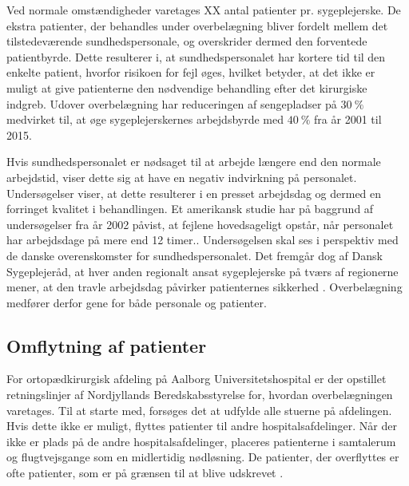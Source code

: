 \noindent 
Ved normale omstændigheder varetages XX antal patienter pr. sygeplejerske. De ekstra patienter, der behandles under overbelægning bliver fordelt mellem det tilstedeværende sundhedspersonale, og overskrider dermed den forventede patientbyrde. 
Dette resulterer i, at sundhedspersonalet har kortere tid til den enkelte patient, hvorfor risikoen for fejl øges, hvilket betyder, at det ikke er muligt at give patienterne den nødvendige behandling efter det kirurgiske indgreb. \cite{Dinges2004} \cite{Aiken2002} Udover overbelægning har reduceringen af sengepladser på $30~\%$ medvirket til, at øge sygeplejerskernes arbejdsbyrde med $40~\%$ fra år 2001 til 2015. \cite{Kjeldsen2015}


Hvis sundhedspersonalet er nødsaget til at arbejde længere end den normale arbejdstid, viser dette sig at have en negativ indvirkning på personalet.\cite{Kjeldsen2015} \cite{Dinges2004} Undersøgelser viser, at dette resulterer i en presset arbejdsdag og dermed en forringet kvalitet i behandlingen. \cite{Kjeldsen2015} Et amerikansk studie har på baggrund af undersøgelser fra år 2002 påvist, at fejlene hovedsageligt opstår, når personalet har arbejdsdage på mere end 12 timer.\cite{Dinges2004}. Undersøgelsen skal ses i perspektiv med de danske overenskomster for sundhedspersonalet. Det fremgår dog af Dansk Sygeplejeråd, at hver anden regionalt ansat sygeplejerske på tværs af regionerne mener, at den travle arbejdsdag påvirker patienternes sikkerhed \cite{Kjeldsen2015}. Overbelægning medfører derfor gene for både personale og patienter. 
 
\subsection{Omflytning af patienter}
For ortopædkirurgisk afdeling på Aalborg Universitetshospital er der opstillet retningslinjer af Nordjyllands Beredskabsstyrelse for, hvordan overbelægningen varetages. Til at starte med, forsøges det at udfylde alle stuerne på afdelingen. Hvis dette ikke er muligt, flyttes patienter til andre hospitalsafdelinger. Når der ikke er plads på de andre hospitalsafdelinger, placeres patienterne i samtalerum og flugtvejsgange som en midlertidig nødløsning. \cite{Beredskab2016} De patienter, der overflyttes er ofte patienter, som er på grænsen til at blive udskrevet .



